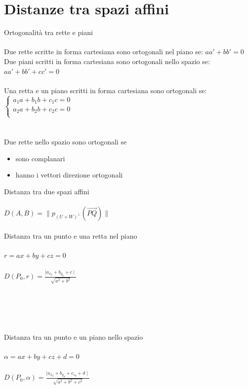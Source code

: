 \documentclass{article}
\begin{document}
\section{Distanze tra spazi affini}
{\large Ortogonalità tra rette e piani}\\\\
Due rette scritte in forma cartesiana sono ortogonali nel piano se: \(aa'+bb'=0\)\\
Due piani scritti in forma cartesiana sono ortogonali nello spazio se: \(aa'+bb'+cc'=0\)\\\\
Una retta e un piano scritti in forma cartesiana sono ortogonali se:\\
\(
\begin{cases}
    a_1a+b_1b+c_1c=0\\
    a_2a+b_2b+c_2c=0\\
\end{cases}
\)\\\\\\
Due rette nello spazio sono ortogonali se
\begin{itemize}
	\item sono complanari
	\item hanno i vettori direzione ortogonali 
\end{itemize}
{\large Distanza tra due spazi affini}\\\\
\(D(A,B)=\|p_{(U+W)^\perp}(\vec{PQ})\|\)\\\\
{\large Distanza tra un punto e una retta nel piano}\\\\
\(r=ax+by+cz=0\)\\\\
\(D(P_0,r)=\frac{\mid a_{x_0}+b_{y_0}+c\mid}{\sqrt{a^2+b^2}}\)\\\\\\\\\\\\
{\large Distanza tra un punto e un piano nello spazio}\\\\
\(\alpha=ax+by+cz+d=0\)\\\\
\(D(P_0,\alpha)=\frac{\mid a_{x_0}+b_{y_0}+c_{z_0}+d\mid}{\sqrt{a^2+b^2+c^2}}\)\\\\\\
\end{document}
